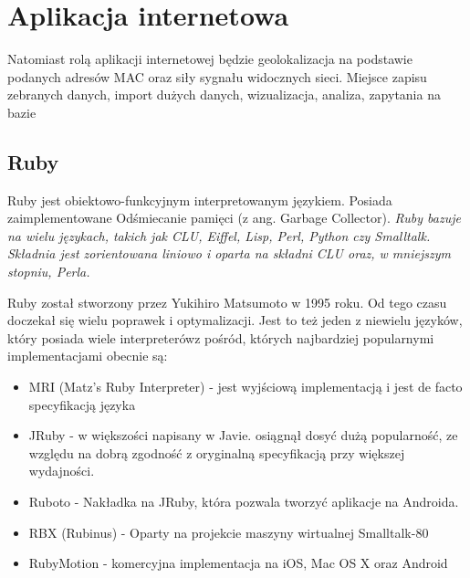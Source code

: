 



\section{Aplikacja internetowa}
Natomiast rolą aplikacji internetowej będzie geolokalizacja na podstawie podanych adresów MAC oraz siły sygnału widocznych sieci. Miejsce zapisu zebranych danych, import dużych danych, wizualizacja, analiza, zapytania na bazie

\subsection{Ruby}
Ruby jest obiektowo-funkcyjnym interpretowanym językiem. Posiada zaimplementowane Odśmiecanie pamięci (z ang. Garbage Collector). \textit{Ruby bazuje na wielu językach, takich jak CLU, Eiffel, Lisp, Perl, Python czy Smalltalk. Składnia jest zorientowana liniowo i oparta na składni CLU oraz, w mniejszym stopniu, Perla.}\cite{RubyWiki}

Ruby został stworzony przez Yukihiro Matsumoto w 1995 roku. Od tego czasu doczekał się wielu poprawek i optymalizacji. Jest to też jeden z niewielu języków, który posiada wiele interpreterówz pośród, których najbardziej popularnymi implementacjami obecnie są:
\begin{itemize}
    \item MRI (Matz's Ruby Interpreter) - jest wyjściową implementacją i jest de facto specyfikacją języka
    \item JRuby - w większości napisany w Javie. osiągnął dosyć dużą popularność, ze względu na dobrą zgodność z oryginalną specyfikacją przy większej wydajności.
    \item Ruboto - Nakładka na JRuby, która pozwala tworzyć aplikacje na Androida.
    \item RBX (Rubinus) - Oparty na projekcie maszyny wirtualnej Smalltalk-80
    \item RubyMotion - komercyjna implementacja na iOS, Mac OS X oraz Android
\end{itemize}

